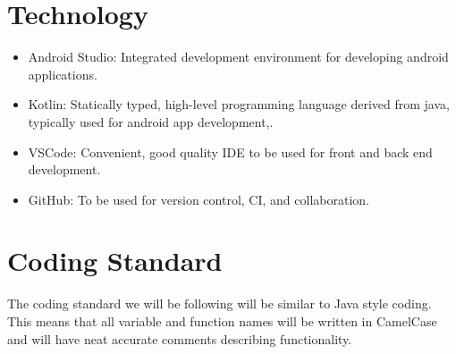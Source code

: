 \documentclass{article}
\begin{document}


\section{Technology}

\begin{itemize}
\item Android Studio: Integrated development environment for developing android applications.
\item Kotlin: Statically typed, high-level programming language derived from java, typically used for android app development,.
\item VSCode: Convenient, good quality IDE to be used for front and back end development.
\item GitHub: To be used for version control, CI, and collaboration.

\end{itemize}

\section{Coding Standard}

The coding standard we will be following will be similar to Java style coding. This means that all variable and function names will be written in CamelCase and will have neat accurate comments describing functionality. 
\end{document}
